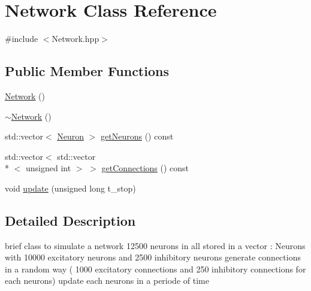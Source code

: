 \hypertarget{classNetwork}{\section{Network Class Reference}
\label{classNetwork}
}


{\ttfamily \#include $<$Network.\-hpp$>$}

\subsection*{Public Member Functions}
\begin{DoxyCompactItemize}
\item 
\hyperlink{classNetwork_a3cc2fb4f8fa4d507077e8da85ce5a1c8}{Network} ()
\item 
\hyperlink{classNetwork_a7a4e19cdb4bf0c7ecf82baa643831492}{$\sim$\-Network} ()
\item 
std\-::vector$<$ \hyperlink{classNeuron}{Neuron} $>$ \hyperlink{classNetwork_a3bd2015d054cef2768ac9d366bac86ab}{get\-Neurons} () const 
\item 
std\-::vector$<$ std\-::vector\\*
$<$ unsigned int $>$ $>$ \hyperlink{classNetwork_ab3eecc6b3cfac0c6e233d6fb379a3fe6}{get\-Connections} () const 
\item 
void \hyperlink{classNetwork_a96bf1a53830f1d5766aeed80d4925447}{update} (unsigned long t\-\_\-stop)
\end{DoxyCompactItemize}


\subsection{Detailed Description}
brief class to simulate a network 12500 neurons in all stored in a vector \-: Neurons with 10000 excitatory neurons and 2500 inhibitory neurons generate connections in a random way ( 1000 excitatory connections and 250 inhibitory connections for each neurons) update each neurons in a periode of time 

